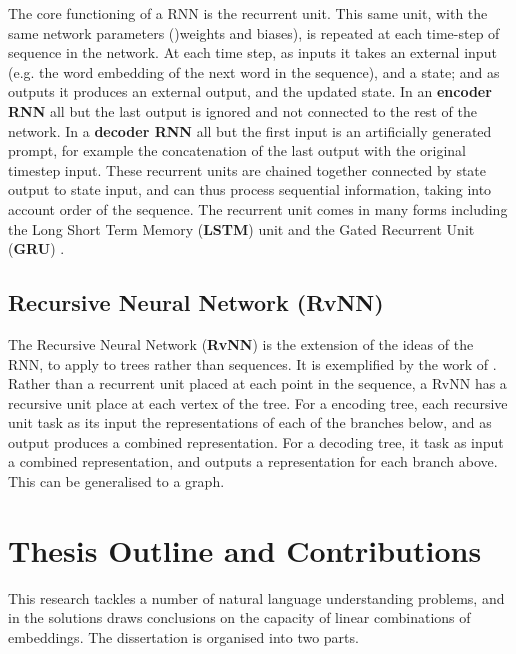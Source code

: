 \documentclass{book}
\begin{document}
The core functioning of a RNN is the recurrent unit.
This  same unit, with the same network parameters ()weights and biases),
is repeated at each time-step of sequence in the network.
At each time step, as inputs it takes an external input (e.g. the word embedding of the next word in the sequence), and a state;
and as outputs it produces an external output, and the updated state.
In an \textbf{encoder RNN} all but the last output is ignored and not connected to the rest of the network.
In a \textbf{decoder RNN} all but the first input is an artificially generated prompt, for example the concatenation of the last output with the original timestep input.
These recurrent units are chained together connected by state output to state input,
and can thus process sequential information, taking into account order of the sequence.
The recurrent unit comes in many forms including the 
Long Short Term Memory (\textbf{LSTM}) unit \citep{hochreiter1997long,gers1999learning}
and the Gated Recurrent Unit (\textbf{GRU})  \citep{chung2014empirical,cho2014properties}.


\subsection {Recursive Neural Network (RvNN)}
The Recursive Neural Network (\textbf{RvNN}) is the extension of the ideas of the RNN,
to apply to trees rather than sequences.
It is exemplified by the work of \citet{socher2014recursive}.
Rather than a recurrent unit placed at each point in the sequence,
a RvNN has a recursive unit place at each vertex of the tree.
For a encoding tree, each recursive unit task as its input the representations of each of the branches below,
and as output produces a combined representation.
For a decoding tree, it task as input a combined representation, and outputs a representation for each branch above.
This can be generalised to a graph.


\section{Thesis Outline and Contributions}
This research tackles a number of natural language understanding problems, and in the solutions draws conclusions on the capacity of linear combinations of embeddings.
The dissertation is organised into two parts.
\end{document}
